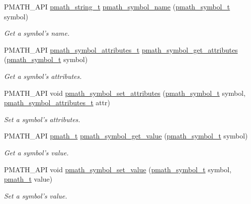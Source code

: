 \begin{CompactItemize}
PMATH\_\-API \hyperlink{classpmath__string__t}{pmath\_\-string\_\-t} \hyperlink{group__symbols_g286ea4e54b4bf2922c519ec5b823bf41}{pmath\_\-symbol\_\-name} (\hyperlink{classpmath__symbol__t}{pmath\_\-symbol\_\-t} symbol)
\begin{CompactList}\small\item\em Get a symbol's name. \item\end{CompactList}\item 
PMATH\_\-API \hyperlink{group__symbols_g5d508ec0d32d617b6c642de54907ee17}{pmath\_\-symbol\_\-attributes\_\-t} \hyperlink{group__symbols_gd553b66226a31e4c105b4f3c93682284}{pmath\_\-symbol\_\-get\_\-attributes} (\hyperlink{classpmath__symbol__t}{pmath\_\-symbol\_\-t} symbol)
\begin{CompactList}\small\item\em Get a symbol's attributes. \item\end{CompactList}\item 
PMATH\_\-API void \hyperlink{group__symbols_g37c740a2074440f4364763a4dbfab931}{pmath\_\-symbol\_\-set\_\-attributes} (\hyperlink{classpmath__symbol__t}{pmath\_\-symbol\_\-t} symbol, \hyperlink{group__symbols_g5d508ec0d32d617b6c642de54907ee17}{pmath\_\-symbol\_\-attributes\_\-t} attr)
\begin{CompactList}\small\item\em Set a symbol's attributes. \item\end{CompactList}\item 
PMATH\_\-API \hyperlink{classpmath__t}{pmath\_\-t} \hyperlink{group__symbols_gbf330376870422d219ae9f0557e515c2}{pmath\_\-symbol\_\-get\_\-value} (\hyperlink{classpmath__symbol__t}{pmath\_\-symbol\_\-t} symbol)
\begin{CompactList}\small\item\em Get a symbol's value. \item\end{CompactList}\item 
PMATH\_\-API void \hyperlink{group__symbols_g8344005c16b86be82d2efdedb0795a0c}{pmath\_\-symbol\_\-set\_\-value} (\hyperlink{classpmath__symbol__t}{pmath\_\-symbol\_\-t} symbol, \hyperlink{classpmath__t}{pmath\_\-t} value)
\begin{CompactList}\small\item\em Set a symbol's value. \item\end{CompactList}\item 

\end{CompactItemize}
